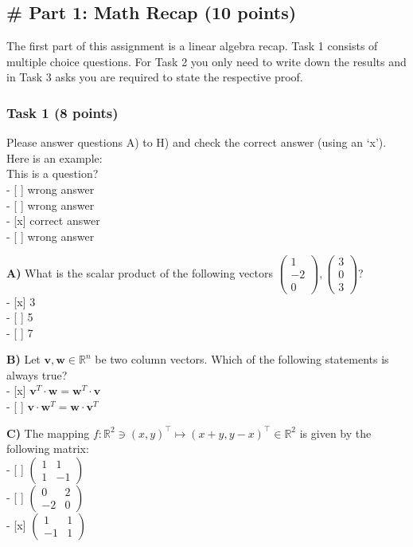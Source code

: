\documentclass[11pt]{article}
\begin{document}
    \hypertarget{part-1-math-recap-10-points}{%
\subsection{\# Part 1: Math Recap (10
points)}\label{part-1-math-recap-10-points}}

The first part of this assignment is a linear algebra recap. Task 1
consists of multiple choice questions. For Task 2 you only need to write
down the results and in Task 3 asks you are required to state the
respective proof.

    \hypertarget{task-1-8-points}{%
\subsubsection{Task 1 (8 points)}\label{task-1-8-points}}

Please answer questions A) to H) and check the correct answer (using an
`x'). Here is an example:\\
This is a question?\\
- {[} {]} wrong answer\\
- {[} {]} wrong answer\\
- {[}x{]} correct answer\\
- {[} {]} wrong answer

    \textbf{A)} What is the scalar product of the following vectors
\(\left( \begin{array}{r} 1 \\ -2 \\ 0 \end{array} \right) , \left( \begin{array}{r} 3 \\ 0 \\ 3 \end{array} \right)\)?\\
- {[}x{]} 3\\
- {[} {]} 5\\
- {[} {]} 7

    \textbf{B)} Let \(\mathbf{v}, \mathbf{w} \in \mathbb{R}^n\) be two
column vectors. Which of the following statements is always true?\\
- {[}x{]}
\(\mathbf{v}^T \cdot \mathbf{w} = \mathbf{w}^T \cdot \mathbf{v}\)\\
- {[} {]}
\(\mathbf{v} \cdot \mathbf{w}^T = \mathbf{w} \cdot \mathbf{v}^T\)

    \textbf{C)} The mapping
\(f: \mathbb{R}^2 \ni (x, y)^\top \mapsto (x + y, y- x)^\top \in \mathbb{R}^2\)
is given by the following matrix:\\
- {[} {]}
\(\left( \begin{array}{rr} 1 & 1 \\ 1& -1 \end{array} \right)\)\\
- {[} {]}
\(\left( \begin{array}{rr} 0 & 2 \\ -2& 0 \end{array} \right)\)\\
- {[}x{]}
\(\left( \begin{array}{rr} 1 & 1 \\ -1& 1 \end{array} \right)\)
\end{document}
